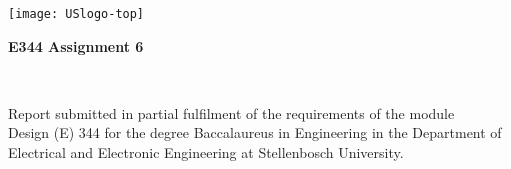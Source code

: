 \graphicspath{{frontmatter/fig/}}

\begin{titlepage}
\begin{center}

\texttt{[image: USlogo-top]}

\vfill

{\sffamily \bfseries \huge E344 Assignment 6 \par}

\vfill

{\large {\Large \nameFull} \\ \stNumber \par}

\vfill

\vfill

{Report submitted in partial fulfilment of the requirements of the module \\
Design (E) 344 for the degree Baccalaureus in Engineering in the Department of
Electrical and Electronic Engineering at Stellenbosch University. \par}

\vfill


\vfill

{\Large \myDate}
\end{center}
\end{titlepage}
